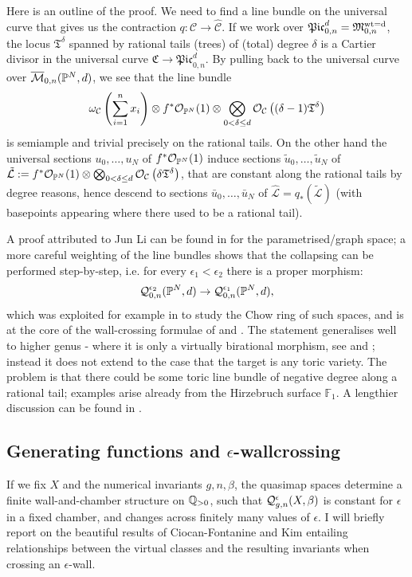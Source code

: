 Here is an outline of the proof. We need to find a line bundle on the universal curve that gives us the contraction $q\colon\mathcal C\to\hat{\mathcal C}$. If we work over $\mathfrak{Pic}^d_{0,n}=\mathfrak M_{0,n}^{\rm{wt}=d}$, the locus $\mathfrak T^\delta$ spanned by rational tails (trees) of (total) degree $\delta$ is a Cartier divisor in the universal curve $\mathfrak C\to\mathfrak{Pic}^d_{0,n}$. By pulling back to the universal curve over $\overline{\mathcal{M}}_{0,n}(\mathbb P^N,d)$, we see that the line bundle \[\omega_\mathcal C\left(\sum_{i=1}^n x_i\right)\otimes f^*\mathcal{O}_{\mathbb P^N}(1)\otimes \bigotimes_{0<\delta\leq d}\mathcal{O}_\mathcal C\left((\delta-1)\mathfrak T^\delta\right) \] is semiample and trivial precisely on the rational tails. On the other hand the universal sections $u_0,\ldots,u_N$ of $f^*\mathcal{O}_{\mathbb P^N}(1)$ induce sections $\tilde{u}_0,\ldots,\tilde{u}_N$ of $\tilde{\mathcal L}:=f^*\mathcal{O}_{\mathbb P^N}(1)\otimes \bigotimes_{0<\delta\leq d}\mathcal{O}_\mathcal C\left(\delta\mathfrak T^\delta\right)$, that are constant along the rational tails by degree reasons, hence descend to sections $\bar{u}_0,\ldots,\bar{u}_N$ of $\hat{\mathcal L}=q_*(\tilde{\mathcal L})$ (with basepoints appearing where there used to be a rational tail).

\begin{rmk}
 A proof attributed to Jun Li can be found in \cite[Lemma 2.6]{LLY1} for the parametrised/graph space; a more careful weighting of the line bundles shows that the collapsing can be performed step-by-step, i.e. for every $\epsilon_1<\epsilon_2$ there is a proper morphism:
 \[ \mathcal{Q}^{\epsilon_2}_{0,n}(\mathbb P^N,d) \rightarrow \mathcal{Q}^{\epsilon_1}_{0,n}(\mathbb P^N,d),\] which was exploited for example in \cite{Mustata} to study the Chow ring of such spaces, and is at the core of the wall-crossing formulae of \cite{TodaStableQuotient} and \cite{CF-K-wallcrossing}. The statement generalises well to higher genus - where it is only a virtually birational morphism, see \cite[Theorem 3]{MOP} and \cite[Proposition 4.21]{Manolache-Push}; instead it does not extend to the case that the target is any toric variety. The problem is that there could be some toric line bundle of negative degree along a rational tail; examples arise already from the Hirzebruch surface $\mathbb F_1$. A lengthier discussion can be found in \cite[Appendix A]{BN}.
\end{rmk}

\subsection{Generating functions and $\epsilon$-wallcrossing}\label{subsec:gf_and_wc} If we fix $X$ and the numerical invariants $g,n,\beta$, the quasimap spaces determine a finite wall-and-chamber structure on $\mathbb{Q}_{>0}$, such that $\mathcal{Q}^{\epsilon}_{g,n}(X,\beta)$ is constant for $\epsilon$ in a fixed chamber, and changes across finitely many values of $\epsilon$. I will briefly report on the beautiful results of Ciocan-Fontanine and Kim \cites{CF-K-wallcrossing,CF-K-higher-genus,CF-K-MirrorSymmetry} entailing relationships between the virtual classes and the resulting invariants when crossing an $\epsilon$-wall.


